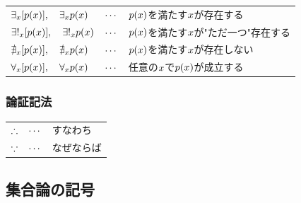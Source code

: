 \documentclass[a4j, 9pt]{ltjsarticle}
\begin{document}
        \begin{center}
          \begin{table}[h]
            \centering
            \begin{threeparttable}
              \begin{tabular}{lcl}
              
                $\displaystyle \exists_x [p(x)], \quad \exists_x p(x)$    & $\displaystyle \cdots$  & $\displaystyle p(x)$を満たす$\displaystyle x$が存在する\\
                $\displaystyle \exists!_x [p(x)], \quad \exists!_x p(x)$  & $\displaystyle \cdots$  & $\displaystyle p(x)$を満たす$\displaystyle x$が"ただ一つ"存在する\\
                $\displaystyle \nexists_x [p(x)], \quad \nexists_x p(x)$  & $\displaystyle \cdots$  & $\displaystyle p(x)$を満たす$\displaystyle x$が存在しない\\
                $\displaystyle \forall_x [p(x)], \quad \forall_x p(x)$    & $\displaystyle \cdots$  & 任意の$\displaystyle x$で$\displaystyle p(x)$が成立する\\

              \end{tabular}
            \end{threeparttable}
          \end{table}
        \end{center}

      \subsubsection{論証記法}

        \blank
        \begin{center}
          \begin{table}[h]
            \centering
            \begin{threeparttable}
              \begin{tabular}{lcl}
              
                $\displaystyle \therefore$  & $\displaystyle \cdots$  & すなわち\\
                $\displaystyle \because$    & $\displaystyle \cdots$  & なぜならば\\

              \end{tabular}
            \end{threeparttable}
          \end{table}
        \end{center}

    \subsection{集合論の記号}
        
\end{document}
